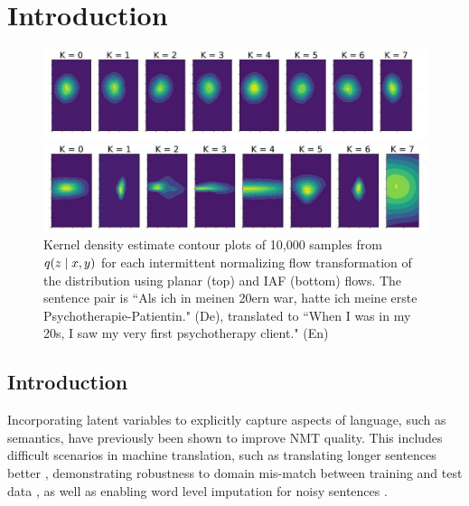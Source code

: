 
\chapter{Introduction}
\label{ch:Introduction}

\begin{figure}[ht]
	\vskip 0.2in
	\begin{center}
		\centerline{\includegraphics[width=\columnwidth]{planar_flows_plot_edited.pdf}}
		\centerline{\includegraphics[width=\columnwidth]{iaf_flows_plot_edited.pdf}}
		\caption{Kernel density estimate contour plots of 10,000 samples from $q(z \; | \;{x, y})$ for each intermittent normalizing flow transformation of the distribution using planar (top) and IAF (bottom) flows. The sentence pair is ``Als ich in meinen 20ern war, hatte ich meine erste Psychotherapie-Patientin." (De), translated to ``When I was in my 20s, I saw my very first psychotherapy client." (En)}
		\label{flowsplot}
	\end{center}
	\vskip -0.2in
	\vspace{-4mm}
\end{figure}

\section{Introduction}

Incorporating latent variables to explicitly capture aspects of language, such as semantics, have previously been shown to improve \ac{NMT} quality. This includes difficult scenarios in machine translation, such as translating longer sentences better \cite{Zhang2016VNMT, harshil2018GNMT, Su2018VRNMT}, demonstrating robustness to domain mis-match between training and test data \cite{eikema2018AEVNMT}, as well as enabling word level imputation for noisy sentences \cite{harshil2018GNMT}. 

